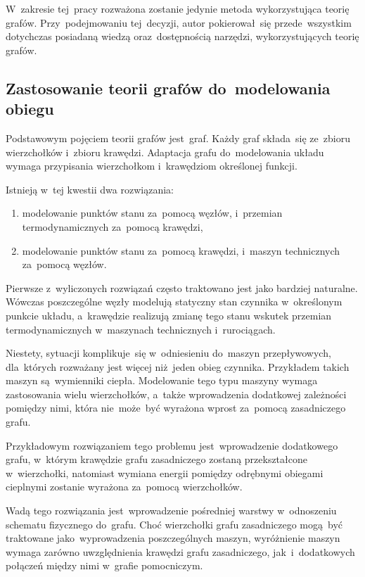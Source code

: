 W~zakresie tej~pracy rozważona zostanie jedynie metoda wykorzystująca
teorię grafów. Przy~podejmowaniu tej~decyzji, autor pokierował~się
przede~wszystkim dotychczas posiadaną wiedzą oraz~dostępnością narzędzi,
wykorzystujących teorię grafów.


\subsection{Zastosowanie teorii grafów do~modelowania obiegu}

Podstawowym pojęciem teorii grafów jest~graf. Każdy graf składa~się
ze~zbioru wierzchołków i~zbioru krawędzi. Adaptacja grafu do~modelowania
układu wymaga przypisania wierzchołkom i~krawędziom określonej funkcji.

Istnieją w~tej kwestii dwa rozwiązania:

\begin{enumerate}
	\item modelowanie punktów stanu za~pomocą węzłów, i~przemian
		termodynamicznych za~pomocą krawędzi,

	\item modelowanie punktów stanu za~pomocą krawędzi, i~maszyn
		technicznych za~pomocą węzłów.
\end{enumerate}

Pierwsze z~wyliczonych rozwiązań często traktowano jest jako bardziej
naturalne. Wówczas poszczególne węzły modelują statyczny stan czynnika
w~określonym punkcie układu, a~krawędzie realizują zmianę tego stanu
wskutek przemian termodynamicznych w~maszynach technicznych
i~rurociągach.

Niestety, sytuacji komplikuje~się w~odniesieniu do~maszyn przepływowych,
dla~których rozważany jest więcej niż~jeden obieg czynnika. Przykładem
takich maszyn są~wymienniki ciepła. Modelowanie tego typu maszyny wymaga
zastosowania wielu wierzchołków, a~także wprowadzenia dodatkowej
zależności pomiędzy nimi, która nie~może~być wyrażona wprost za~pomocą
zasadniczego grafu.

Przykładowym rozwiązaniem tego problemu jest~wprowadzenie dodatkowego
grafu, w~którym krawędzie grafu zasadniczego zostaną przekształcone
w~wierzchołki, natomiast wymiana energii pomiędzy odrębnymi obiegami
cieplnymi zostanie wyrażona za~pomocą wierzchołków.

Wadą tego rozwiązania jest~wprowadzenie pośredniej warstwy w~odnoszeniu
schematu fizycznego do~grafu. Choć wierzchołki grafu zasadniczego
mogą~być traktowane jako~wyprowadzenia poszczególnych maszyn,
wyróżnienie maszyn wymaga zarówno uwzględnienia krawędzi grafu
zasadniczego, jak~i~dodatkowych połączeń między nimi w~grafie
pomocniczym.

